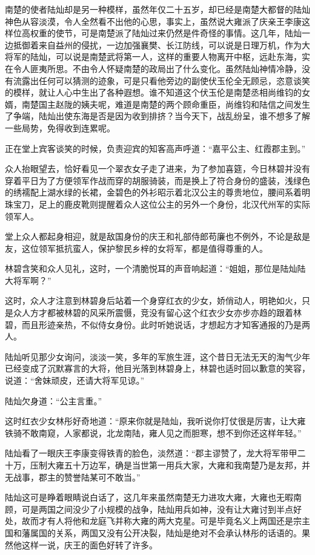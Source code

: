 南楚的使者陆灿却是另一种模样，虽然年仅二十五岁，却已经是南楚大都督的陆灿神色从容淡漠，令人全然看不出他的心思，事实上，虽然说大雍派了庆亲王李康这样位高权重的使节，可是南楚派了陆灿过来仍然是件奇怪的事情。这几年，陆灿一边抵御着来自益州的侵扰，一边加强襄樊、长江防线，可以说是日理万机，作为大将军的陆灿，可以说是南楚武将第一人，这样的重要人物离开中枢，远赴东海，实在令人匪夷所思。不由令人怀疑南楚的政局出了什么变化。虽然陆灿神情冷静，没有流露出任何可以猜测的迹象，可是只看他旁边的副使伏玉伦全无顾忌，恣意谈笑的模样，就让人心中生出了各种遐想。谁不知道这个伏玉伦是南楚丞相尚维钧的女婿，南楚国主赵陇的姨夫呢，难道是南楚的两个顾命重臣，尚维钧和陆信之间发生了争端，陆灿出使东海是否是因为收到排挤？当今天下，战乱纷呈，谁不想多了解一些局势，免得收到连累呢。

正在堂上宾客谈笑的时候，负责迎宾的知客高声呼道：“嘉平公主、红霞郡主到。”

众人抬眼望去，恰好看见一个翠衣女子走了进来，为了参加喜筵，今日林碧并没有穿着平日为了方便领军作战而穿的胡服骑装，而是换上了符合身份的盛装，浅绿色的绣襦配上湖水绿的长裙，金碧色的外衫昭示着北汉公主的尊贵地位，腰间系着明珠宝刀，足上的鹿皮靴则提醒着众人这位公主的另外一个身份，北汉代州军的实际领军人。

堂上众人都起身相迎，就是敌国身份的庆王和礼部侍郎苟廉也不例外，不论是敌是友，这位领军抵抗蛮人，保护黎民乡梓的女将军，都是值得尊重的人。

林碧含笑和众人见礼，这时，一个清脆悦耳的声音响起道：“姐姐，那位是陆灿陆大将军啊？”

这时，众人才注意到林碧身后站着一个身穿红衣的少女，娇俏动人，明艳如火，只是众人方才都被林碧的风采所震慑，竞没有留心这个红衣少女亦步亦趋的跟着林碧，而且形迹亲热，不似侍女身份。此时听她说话，才想起方才知客通报的乃是两人。

陆灿听见那少女询问，淡淡一笑，多年的军旅生涯，这个昔日无法无天的淘气少年已经变成了沉默寡言的大将，他目光落到林碧身上，林碧也适时回以歉意的笑容，说道：“舍妹顽皮，还请大将军见谅。”

陆灿欠身道：“公主言重。”

这时红衣少女林彤好奇地道：“原来你就是陆灿，我听说你打仗很是厉害，让大雍铁骑不敢南窥，人家都说，北龙南陆，雍人见之而胆寒，想不到你还这样年轻。”

陆灿看了一眼庆王李康变得铁青的脸色，淡然道：“郡主谬赞了，龙大将军带甲二十万，压制大雍五十万边军，确是当世第一用兵大家，大雍和我南楚乃是友邦，并无战事，郡主的赞誉陆某可不敢当。”

陆灿这可是睁着眼睛说白话了，这几年来虽然南楚无力进攻大雍，大雍也无暇南顾，可是两国之间没少了小规模的战争，陆灿用兵如神，没有让大雍讨到半点好处，故而才有人将他和龙庭飞并称大雍的两大克星。可是毕竟名义上两国还是宗主国和藩属国的关系，两国又没有公开决裂，陆灿是绝对不会承认林彤的话语的。果然他这样一说，庆王的面色好转了许多。

